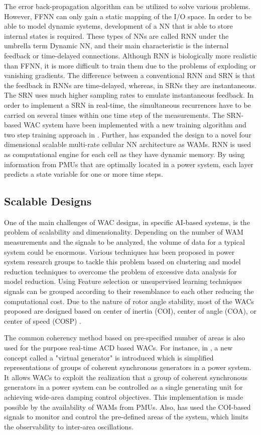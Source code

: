\documentclass[journal]{IEEEtran}
\begin{document}
The error back-propagation algorithm can be utilized to solve various problems. However, FFNN can only gain a static mapping of the I/O space. In order to be able to model dynamic systems, development of a NN that is able to store internal states is required. These types of NNs are called RNN under the umbrella term Dynamic NN, and their main characteristic is the internal feedback or time-delayed connections. Although RNN is biologically more realistic than FFNN, it is more difficult to train them due to the problems of exploding or vanishing gradients. The difference between a conventional RNN and SRN is that the feedback  in RNNs are time-delayed, whereas, in SRNs they are instantaneous. The SRN uses much higher sampling rates to emulate instantaneous feedback. In order to implement a SRN in real-time, the simultaneous recurrences have to be carried on several times within one time step of the measurements. The SRN-based WAC system have been implemented with a new training algorithm and two step training approach in \cite{5434727}. Further, \cite{6252647} has expanded the design to a novel four dimensional scalable multi-rate cellular NN architecture as WAMs. RNN is used as computational engine for each cell as they have dynamic memory. By using information from PMUs that are optimally located in a power system, each layer predicts a state variable for one or more time steps.

\subsection{Scalable Designs}
One of the main challenges of WAC designs, in specific AI-based systems, is the problem of scalability and dimensionality. Depending on the number of WAM measurements and the signals to be analyzed, the volume of data for a typical system could be enormous. Various techniques has been proposed in power system research groups to tackle this problem based on clustering and model reduction techniques to overcome the problem of excessive data analysis for model reduction. Using Feature selection or unsupervised learning techniques signals can be grouped according to their resemblance to each other reducing the computational cost. Due to the nature of rotor angle stability, most of the WACs proposed are designed based on center of inertia (COI), center of angle (COA), or center of speed (COSP) \cite{4749253}. 

The common coherency method based on pre-specified number of areas is also used for the purpose real-time ACD based WACs. For instance, in \cite{6345608}, a new concept called a "virtual generator" is introduced which is simplified representations of groups of coherent synchronous generators in a power system. It allows WACs to exploit the realization that a group of coherent synchronous generators in a power system can be controlled as a single generating unit for achieving wide-area damping control objectives. This implementation is made possible by the availability of WAMs from PMUs. Also, \cite{7185402} has used the COI-based signals to monitor and control the pre-defined areas of the system, which limits the observability to inter-area oscillations.
\end{document}
